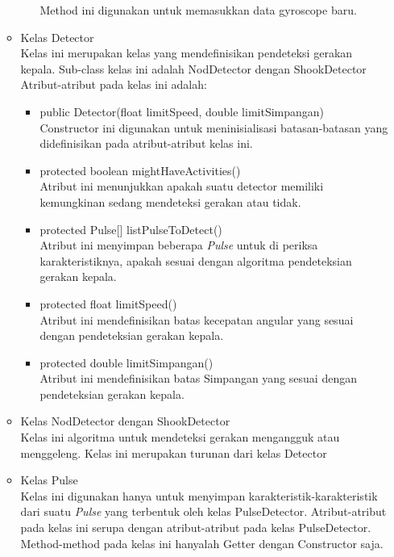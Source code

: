 \begin{itemize}
\begin{itemize}
\begin{itemize}
            Method ini digunakan untuk memasukkan data gyroscope baru.
        \end{itemize}
        \item Kelas Detector\\
        Kelas ini merupakan kelas yang mendefinisikan pendeteksi gerakan kepala. Sub-class kelas ini adalah NodDetector dengan ShookDetector
        Atribut-atribut pada kelas ini adalah:
        \begin{itemize}
            \item public Detector(float limitSpeed, double limitSimpangan)\\
            Constructor ini digunakan untuk meninisialisasi batasan-batasan yang didefinisikan pada atribut-atribut kelas ini.
            \item protected boolean mightHaveActivities()\\
            Atribut ini menunjukkan apakah suatu detector memiliki kemungkinan sedang mendeteksi gerakan atau tidak.
            \item protected Pulse[] listPulseToDetect()\\
            Atribut ini menyimpan beberapa \textit{Pulse} untuk di periksa karakteristiknya, apakah sesuai dengan algoritma pendeteksian gerakan kepala.
            \item protected float limitSpeed()\\
            Atribut ini mendefinisikan batas kecepatan angular yang sesuai dengan pendeteksian gerakan kepala.
            \item protected double limitSimpangan()\\
            Atribut ini mendefinisikan batas Simpangan yang sesuai dengan pendeteksian gerakan kepala.
        \end{itemize}
        \item Kelas NodDetector dengan ShookDetector\\
        Kelas ini algoritma untuk mendeteksi gerakan mengangguk atau menggeleng. Kelas ini merupakan turunan dari kelas Detector
        \item Kelas Pulse\\
        Kelas ini digunakan hanya untuk menyimpan karakteristik-karakteristik dari suatu \textit{Pulse} yang terbentuk oleh kelas PulseDetector. Atribut-atribut pada kelas ini serupa dengan atribut-atribut pada kelas PulseDetector. Method-method pada kelas ini hanyalah Getter dengan Constructor saja.  
    \end{itemize}
\end{itemize}


